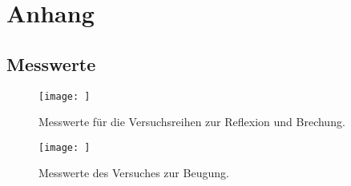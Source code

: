 \section{Anhang}
\subsection{Messwerte}

\begin{figure}
    \centering
    \texttt{[image: ]}
    \caption{Messwerte für die Versuchsreihen zur Reflexion und Brechung.}
\end{figure}

\begin{figure}
    \centering
    \texttt{[image: ]}
    \caption{Messwerte des Versuches zur Beugung.}
\end{figure}